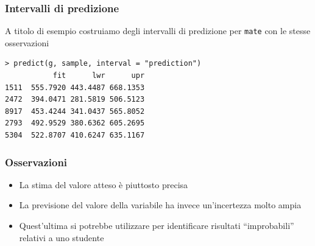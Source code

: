 \documentclass{beamer}
\begin{document}
\begin{frame}[fragile]
\frametitle{Intervalli di predizione}
A titolo di esempio costruiamo degli intervalli di predizione per \texttt{mate} con le stesse osservazioni
{\scriptsize
\begin{verbatim}
> predict(g, sample, interval = "prediction")
           fit      lwr      upr
1511  555.7920 443.4487 668.1353
2472  394.0471 281.5819 506.5123
8917  453.4244 341.0437 565.8052
2793  492.9529 380.6362 605.2695
5304  522.8707 410.6247 635.1167
\end{verbatim}
}
\end{frame}

\begin{frame}
\frametitle{Osservazioni}
\begin{itemize}
\item La stima del valore atteso è piuttosto precisa
\item La previsione del valore della variabile ha invece un'incertezza molto ampia
\item Quest'ultima si potrebbe utilizzare per identificare risultati ``improbabili'' relativi a uno studente 
\end{itemize}
\end{frame}
\end{document}
